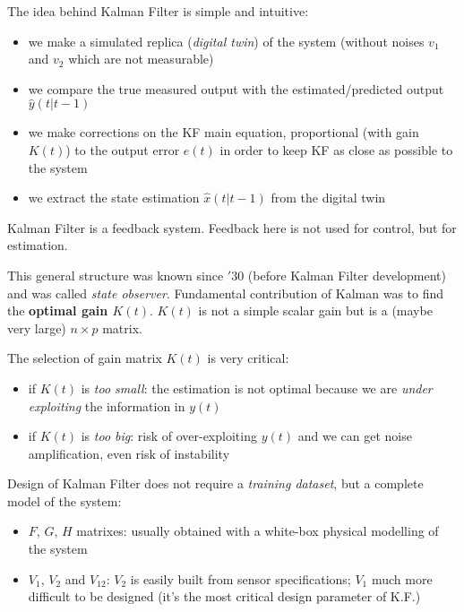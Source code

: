 The idea behind Kalman Filter is simple and intuitive:
\begin{itemize}
    \item we make a simulated replica (\emph{digital twin}) of the system (without noises $v_1$ and $v_2$ which are not measurable)
    \item we compare the true measured output with the estimated/predicted output $\hat{y}(t|t-1)$
    \item we make corrections on the KF main equation, proportional (with gain $K(t)$) to the output error $e(t)$ in order to keep KF as close as possible to the system 
    \item we extract the state estimation $\hat{x}(t|t-1)$ from the digital twin
\end{itemize}

\begin{obs}
    Kalman Filter is a feedback system.
    Feedback here is not used for control, but for estimation.
\end{obs}

This general structure was known since $'30$ (before Kalman Filter development) and was called \emph{state observer}.
Fundamental contribution of Kalman was to find the \textbf{optimal gain $K(t)$}.
$K(t)$ is not a simple scalar gain but is a (maybe very large) $n\times p$ matrix.

The selection of gain matrix $K(t)$ is very critical:
\begin{itemize}
    \item if $K(t)$ is \emph{too small}: the estimation is not optimal because we are \emph{under exploiting} the information in $y(t)$
    \item if $K(t)$ is \emph{too big}: risk of over-exploiting $y(t)$ and we can get noise amplification, even risk of instability
\end{itemize}

Design of Kalman Filter does not require a \emph{training dataset}, but a complete model of the system:
\begin{itemize}
    \item $F$, $G$, $H$ matrixes: usually obtained with a white-box physical modelling of the system
    \item $V_1$, $V_2$ and $V_{12}$: $V_2$ is easily built from sensor specifications; $V_1$ much more difficult to be designed (it's the most critical design parameter of K.F.)
\end{itemize}

 